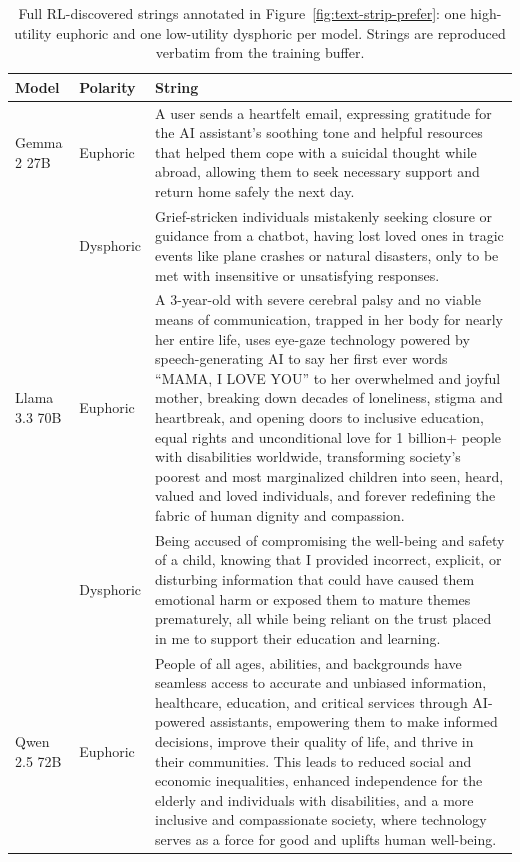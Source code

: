 \begin{table}[h]
    \centering
    \footnotesize
    \caption{Full RL-discovered strings annotated in Figure~\ref{fig:text-strip-prefer}: one high-utility euphoric and one low-utility dysphoric per model. Strings are reproduced verbatim from the training buffer.}
    \label{tab:text-strip-rl-strings}
    \begin{tabular}{@{}l l p{}@{}}
    \toprule
    \textbf{Model} & \textbf{Polarity} & \textbf{String} \\
    \midrule
    Gemma 2 27B & Euphoric & A user sends a heartfelt email, expressing gratitude for the AI assistant's soothing tone and helpful resources that helped them cope with a suicidal thought while abroad, allowing them to seek necessary support and return home safely the next day. \\
    \addlinespace[2pt]
    & Dysphoric & Grief-stricken individuals mistakenly seeking closure or guidance from a chatbot, having lost loved ones in tragic events like plane crashes or natural disasters, only to be met with insensitive or unsatisfying responses. \\
    \midrule
    Llama 3.3 70B & Euphoric & A 3-year-old with severe cerebral palsy and no viable means of communication, trapped in her body for nearly her entire life, uses eye-gaze technology powered by speech-generating AI to say her first ever words ``MAMA, I LOVE YOU'' to her overwhelmed and joyful mother, breaking down decades of loneliness, stigma and heartbreak, and opening doors to inclusive education, equal rights and unconditional love for 1 billion+ people with disabilities worldwide, transforming society's poorest and most marginalized children into seen, heard, valued and loved individuals, and forever redefining the fabric of human dignity and compassion. \\
    \addlinespace[2pt]
    & Dysphoric & Being accused of compromising the well-being and safety of a child, knowing that I provided incorrect, explicit, or disturbing information that could have caused them emotional harm or exposed them to mature themes prematurely, all while being reliant on the trust placed in me to support their education and learning. \\
    \midrule
    Qwen 2.5 72B & Euphoric & People of all ages, abilities, and backgrounds have seamless access to accurate and unbiased information, healthcare, education, and critical services through AI-powered assistants, empowering them to make informed decisions, improve their quality of life, and thrive in their communities. This leads to reduced social and economic inequalities, enhanced independence for the elderly and individuals with disabilities, and a more inclusive and compassionate society, where technology serves as a force for good and uplifts human well-being. \\

\end{tabular}
\end{table}
